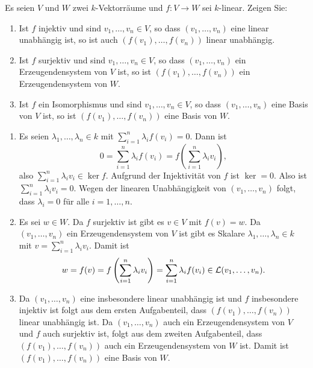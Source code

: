 \begin{question}
 Es seien $V$ und $W$ zwei $k$-Vektorräume und $f \colon V \to W$ sei $k$-linear. Zeigen Sie:
 \begin{enumerate}
  \item
   Ist $f$ injektiv und sind $v_1, \dotsc, v_n \in V$, so dass $(v_1, \dotsc, v_n)$ eine linear unabhängig ist, so ist auch $(f(v_1), \dotsc, f(v_n))$ linear unabhängig.
  \item
   Ist $f$ surjektiv und sind $v_1, \dotsc, v_n \in V$, so dass $(v_1, \dotsc, v_n)$ ein Erzeugendensystem von $V$ ist, so ist \mbox{$(f(v_1), \dotsc, f(v_n))$} ein Erzeugendensystem von $W$.
  \item
   Ist $f$ ein Isomorphismus und sind $v_1, \dotsc, v_n \in V$, so dass $(v_1, \dotsc, v_n)$ eine Basis von $V$ ist, so ist \mbox{$(f(v_1), \dotsc, f(v_n))$} eine Basis von $W$.
 \end{enumerate}
\end{question}
\begin{solution}
 \begin{enumerate}
  \item
   Es seien $\lambda_1, \dotsc, \lambda_n \in k$ mit $\sum_{i=1}^n \lambda_i f(v_i) = 0$. Dann ist
   \[
    0 = \sum_{i=1}^n \lambda_i f(v_i) = f\left( \sum_{i=1}^n \lambda_i v_i \right),
   \]
   also $\sum_{i=1}^n \lambda_i v_i \in \ker f$. Aufgrund der Injektivität von $f$ ist $\ker = 0$. Also ist $\sum_{i=1}^n \lambda_i v_i = 0$. Wegen der linearen Unabhängigkeit von $(v_1, \dotsc, v_n)$ folgt, dass $\lambda_i = 0$ für alle $i = 1, \dotsc, n$.
  \item
   Es sei $w \in W$. Da $f$ surjektiv ist gibt es $v \in V$ mit $f(v) = w$. Da $(v_1, \dotsc, v_n)$ ein Erzeugendensystem von $V$ ist gibt es Skalare $\lambda_1, \dotsc, \lambda_n \in k$ mit $v = \sum_{i=1}^n \lambda_i v_i$. Damit ist
   \[
    w
    = f(v)
    = f\left( \sum_{i=1}^n \lambda_i v_i \right)
    = \sum_{i=1}^n \lambda_i f(v_i)
    \in \mathcal{L}(v_1, \dotsc, v_n).
   \]
  \item
   Da $(v_1, \dotsc, v_n)$ eine insbesondere linear unabhängig ist und $f$ insbesondere injektiv ist folgt aus dem ersten Aufgabenteil, dass $(f(v_1), \dotsc, f(v_n))$ linear unabhängig ist. Da $(v_1, \dotsc, v_n)$ auch ein Erzeugendensystem von $V$ und $f$ auch surjektiv ist, folgt aus dem zweiten Aufgabenteil, dass $(f(v_1), \dotsc, f(v_n))$ auch ein Erzeugendensystem von $W$ ist. Damit ist $(f(v_1), \dotsc, f(v_n))$ eine Basis von $W$.
 \end{enumerate}
\end{solution}


